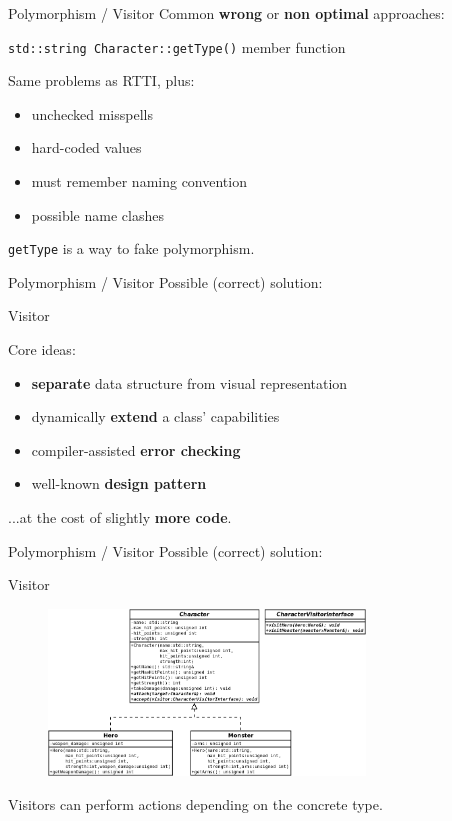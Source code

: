 \documentclass[11pt]{beamer}
\renewcommand{\emph}[1]{\textbf{#1}}
\begin{document}
\begin{frame}{Polymorphism / Visitor}
 Common \emph{wrong} or \emph{non optimal} approaches:
 
 \begin{center}
  \texttt{std::string Character::getType()} member function
 \end{center}
 
 Same problems as RTTI, plus:
 \begin{itemize}
  \item unchecked misspells
  \item hard-coded values
  \item must remember naming convention
  \item possible name clashes
 \end{itemize}
 
 \texttt{getType} is a way to fake polymorphism.
\end{frame}

\begin{frame}{Polymorphism / Visitor}
 Possible (correct) solution:
 
 \begin{center}
  Visitor
 \end{center}
 
 Core ideas:
 \begin{itemize}
  \item \emph{separate} data structure from visual representation
  \item dynamically \emph{extend} a class' capabilities
  \item compiler-assisted \emph{error checking}
  \item well-known \emph{design pattern}
 \end{itemize}
 
 ...at the cost of slightly \emph{more code}.
\end{frame}

\begin{frame}{Polymorphism / Visitor}
 Possible (correct) solution:
 
 \begin{center}
  Visitor
 \end{center}
 
 \begin{figure}
  \includegraphics[width=0.75\textwidth]{assets/diagram-battle-scene-2}
 \end{figure}
 
 Visitors can perform actions depending on the concrete type.
\end{frame}
\end{document}

